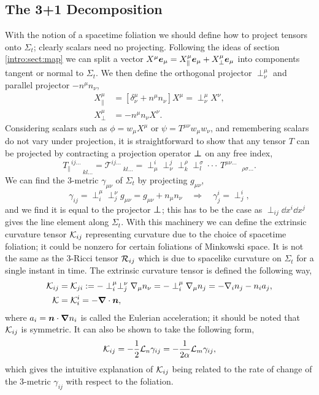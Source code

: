 \subsection{The 3+1 Decomposition} \label{nr:sec:3plus1}
With the notion of a spacetime foliation we should define how to project tensors onto $\Sigma_t$; clearly scalars need no projecting. Following the ideas of section \ref{intro:sect:map} we can split a vector $X^\mu \boldsymbol{e}_\mu = X^\mu_\| \boldsymbol{e}_\mu + X^\mu_\perp \boldsymbol{e}_\mu$ into components tangent or normal to $\Sigma_t$. We then define the orthogonal projector $\perp^\mu_\nu$ and parallel projector $-n^\mu n_\nu$,
\begin{align}X^\mu_\| &= \left[ \delta^\mu_\nu + n^\mu n_\nu\right] X^\mu  = \perp^\mu_\nu X^\nu,\\
X^\mu_\perp &= -n^\mu n_\nu X^\nu .\end{align}
Considering scalars such as $\phi = w_\mu X^\mu$ or $\psi = T^{\mu\nu}w_\mu w_\nu$, and remembering scalars do not vary under projection, it is straightforward to show that any tensor $T$ can be projected by contracting a projection operator $\boldsymbol{\perp}$ on any free index,
\begin{equation} {T_\|}^{ij ...}_{\;\;\;\;\;\;\;kl ...} = {\mathcal{T}}^{ij ...}_{\;\;\;\;\;\;\;kl ...} =\perp^{i}_{\mu}\perp^{j}_{\nu}\perp^{\rho}_{k}\perp^{\sigma}_{l}\cdot\cdot\cdot\, T^{\mu\nu ...}_{\;\;\;\;\;\;\;\;\;\;\rho\sigma ...}.\end{equation}
We can find the 3-metric $\gamma_{\mu\nu}$ of $\Sigma_t$ by projecting $g_{\mu\nu}$, 
\begin{equation} \label{nr:eq:gammaij}
\gamma_{ij} = \perp^\mu_i \perp^\nu_j g_{\mu\nu} = g_{\mu\nu} + n_\mu n_\nu\quad \Rightarrow \quad \gamma^i_j = \perp^i_j,
\end{equation}
and we find it is equal to the projector $\boldsymbol{\perp}$; this has to be the case as $\perp_{ij}\dd x^i\dd x^j$ gives the line element along $\Sigma_t$. With this machinery we can define the extrinsic curvature tensor $\mathcal{K}_{ij}$ representing curvature due to the choice of spacetime foliation; it could be nonzero for certain foliations of Minkowski space. It is not the same as the 3-Ricci tensor $\mathcal{R}_{ij}$ which is due to spacelike curvature on $\Sigma_t$ for a single instant in time. The extrinsic curvature tensor is defined the following way,
\begin{align} \label{nr:eq:Kij}\mathcal{K}_{ij}  &= \mathcal{K}_{ji}:= -\perp_i^\mu \perp_j^\nu \nabla_\mu n_\nu = -\perp_i^\mu \nabla_\mu n_j = -\nabla_i n_j - n_i a_j, \\
\mathcal{K} &= \mathcal{K}_i^i = -\boldsymbol{\nabla} \cdot \boldsymbol{n},\end{align}
where $a_i = \boldsymbol{n}\cdot\boldsymbol{\nabla} n_i $ is called the Eulerian acceleration; it should be noted that $\mathcal{K}_{ij}$ is symmetric. It can also be shown to take the following form,
\begin{equation}\label{nr:eq:lmL=alnK} \mathcal{K}_{ij} = -\frac{1}{2}\mathcal{L}_n \gamma_{ij} = -\frac{1}{2\alpha}\mathcal{L}_m \gamma_{ij},\end{equation}
which gives the intuitive explanation of $\mathcal{K}_{ij}$ being related to the rate of change of the 3-metric $\gamma_{ij}$ with respect to the foliation. 

